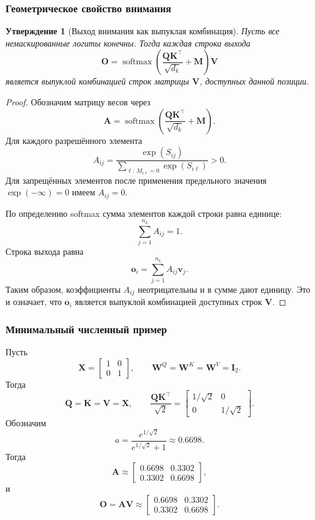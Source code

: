 \documentclass[12pt,a4paper]{article}
\newtheorem{proposition}[theorem]{Утверждение}
\theoremstyle{definition}
\newcommand{\softmax}{\operatorname{softmax}}
\newcommand{\1}{\mathbf{1}}
\begin{document}
\subsubsection{Геометрическое свойство внимания}

\begin{proposition}[Выход внимания как выпуклая комбинация]
Пусть все немаскированные логиты конечны. Тогда каждая строка выхода
\[
    \bm{O}
    =
    \softmax\left(
        \frac{\bm{Q}\bm{K}^{\top}}{\sqrt{d_k}}+\bm{M}
    \right)\bm{V}
\]
является выпуклой комбинацией строк матрицы $\bm{V}$, доступных данной
позиции.
\end{proposition}

\begin{proof}
Обозначим матрицу весов через
\[
    \bm{A}
    =
    \softmax\left(
        \frac{\bm{Q}\bm{K}^{\top}}{\sqrt{d_k}}+\bm{M}
    \right).
\]
Для каждого разрешённого элемента
\[
    A_{ij}
    =
    \frac{\exp(S_{ij})}
         {\sum_{\ell:\,M_{i\ell}=0}\exp(S_{i\ell})}>0.
\]
Для запрещённых элементов после применения предельного значения
$\exp(-\infty)=0$ имеем $A_{ij}=0$.

По определению softmax сумма элементов каждой строки равна единице:
\[
    \sum_{j=1}^{n_k}A_{ij}=1.
\]
Строка выхода равна
\[
    \bm{o}_i=\sum_{j=1}^{n_k}A_{ij}\bm{v}_j.
\]
Таким образом, коэффициенты $A_{ij}$ неотрицательны и в сумме дают
единицу. Это и означает, что $\bm{o}_i$ является выпуклой комбинацией
доступных строк $\bm{V}$.
\end{proof}

\subsubsection{Минимальный численный пример}

Пусть
\[
    \bm{X}
    =
    \begin{bmatrix}
        1&0\\
        0&1
    \end{bmatrix},
    \qquad
    \bm{W}^Q=\bm{W}^K=\bm{W}^V=\bm{I}_2.
\]
Тогда
\[
    \bm{Q}=\bm{K}=\bm{V}=\bm{X},
    \qquad
    \frac{\bm{Q}\bm{K}^{\top}}{\sqrt{2}}
    =
    \begin{bmatrix}
        1/\sqrt{2}&0\\
        0&1/\sqrt{2}
    \end{bmatrix}.
\]
Обозначим
\[
    a
    =
    \frac{e^{1/\sqrt{2}}}
         {e^{1/\sqrt{2}}+1}
    \approx 0.6698.
\]
Тогда
\[
    \bm{A}
    \approx
    \begin{bmatrix}
        0.6698&0.3302\\
        0.3302&0.6698
    \end{bmatrix},
\]
и
\[
    \bm{O}=\bm{A}\bm{V}
    \approx
    \begin{bmatrix}
        0.6698&0.3302\\
        0.3302&0.6698
    \end{bmatrix}.
\]
\end{document}
